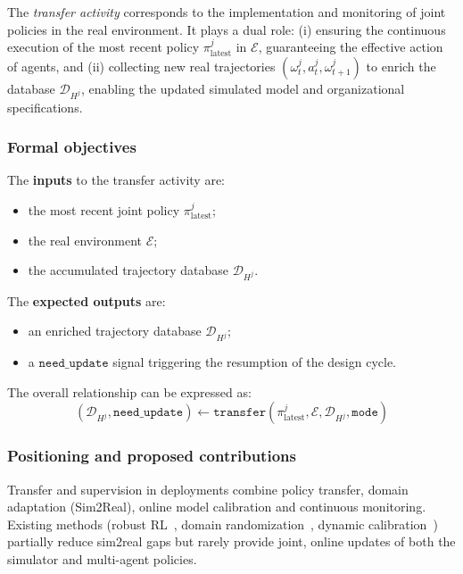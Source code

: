 \documentclass[pdflatex,sn-mathphys-num]{sn-jnl}%
\theoremstyle{thmstyleone}%
\theoremstyle{thmstyletwo}%
\theoremstyle{thmstylethree}%
\begin{document}
The \textit{transfer activity} corresponds to the implementation and monitoring of joint policies in the real environment.
It plays a dual role: (i) ensuring the continuous execution of the most recent policy $\pi^j_{\text{latest}}$ in $\mathcal{E}$, guaranteeing the effective action of agents, and (ii) collecting new real trajectories $(\omega^j_t, a^j_t, \omega^j_{t+1})$ to enrich the database $\mathcal{D}_{H^j}$, enabling the updated simulated model and organizational specifications.

\subsubsection*{Formal objectives}

The \textbf{inputs} to the transfer activity are:
\begin{itemize}
    \item the most recent joint policy $\pi^j_{\text{latest}}$;
    \item the real environment $\mathcal{E}$;
    \item the accumulated trajectory database $\mathcal{D}_{H^j}$.
\end{itemize}

\noindent
The \textbf{expected outputs} are:
\begin{itemize}
    \item an enriched trajectory database $\mathcal{D}_{H^j}$;
    \item a $\texttt{need\_update}$ signal triggering the resumption of the design cycle.
\end{itemize}

The overall relationship can be expressed as:
\[
    (\mathcal{D}_{H^j}, \texttt{need\_update}) \gets \texttt{transfer}(\pi^j_{\text{latest}}, \mathcal{E}, \mathcal{D}_{H^j}, \texttt{mode})
\]

\subsubsection*{Positioning and proposed contributions}

Transfer and supervision in deployments combine policy transfer, domain adaptation (Sim2Real), online model calibration and continuous monitoring. Existing methods (robust RL~\cite{pinto2017robust}, domain randomization~\cite{tobin2017domain,ganin2016domain}, dynamic calibration~\cite{deisenroth2011pilco}) partially reduce sim2real gaps but rarely provide joint, online updates of both the simulator and multi-agent policies.
\end{document}
